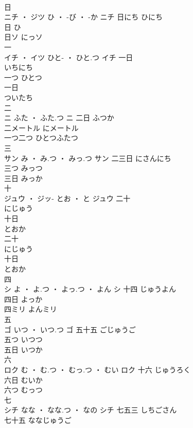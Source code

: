 \documentclass[8pt]{extreport}
\begin{document}
\begin{CJK}{UTF8}{min}
\\	日	
\\	ニチ ・ ジツ	ひ ・ -び ・ -か	ニチ	日にち	ひにち	
\\	日	ひ	
\\	日ソ	にっソ	
\\	一	
\\	イチ ・ イツ	ひと- ・ ひと.つ	イチ	一日 
\\	いちにち	
\\	一つ	ひとつ	
\\	一日 
\\	ついたち	
\\	二	
\\	ニ	ふた ・ ふた.つ	ニ	二日	ふつか	
\\	二メートル	にメートル	
\\	一つ二つ	ひとつふたつ	
\\	三	
\\	サン	み ・ み.つ ・ みっ.つ	サン	二三日	にさんにち	
\\	三つ	みっつ	
\\	三日	みっか	
\\	十	
\\	ジュウ ・ ジッ-	とお ・ と	ジュウ	二十 
\\	にじゅう	
\\	十日 
\\	とおか	
\\	二十 
\\	にじゅう	
\\	十日 
\\	とおか	
\\	四	
\\	シ	よ ・ よ.つ ・ よっ.つ ・ よん	シ	十四	じゅうよん	
\\	四日	よっか	
\\	四ミリ	よんミリ	
\\	五	
\\	ゴ	いつ ・ いつ.つ	ゴ	五十五	ごじゅうご	
\\	五つ	いつつ	
\\	五日	いつか	
\\	六	
\\	ロク	む ・ む.つ ・ むっ.つ ・ むい	ロク	十六	じゅうろく	
\\	六日	むいか	
\\	六つ	むっつ	
\\	七	
\\	シチ	なな ・ なな.つ ・ なの	シチ	七五三	しちごさん	
\\	七十五	ななじゅうご	

\end{CJK}
\end{document}

